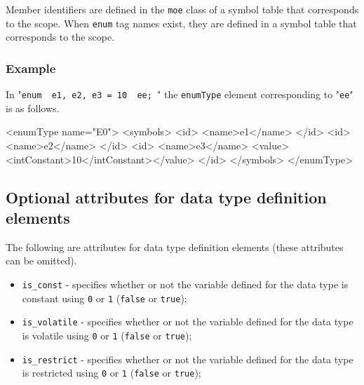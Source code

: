 Member identifiers are defined in the {\tt moe} class of a symbol table that corresponds to the scope.  When {\tt enum} tag names exist, they are defined in a symbol table that corresponds to the scope.

\subsubsection*{Example}

In "{\tt enum { e1, e2, e3 = 10 } ee; }" the {\tt enumType} element corresponding to "{\tt ee}" is as follows.
\vspace{2mm}

\begin{XcodeMLExample}
  <enumType name="E0">
    <symbols> 
      <id>
        <name>e1</name>
      </id>
      <id>
        <name>e2</name>
      </id>
      <id>
        <name>e3</name>
        <value><intConstant>10</intConstant></value>
      </id>
    </symbols>
  </enumType>
\end{XcodeMLExample}


\subsection{Optional attributes for data type definition elements}

The following are attributes for data type definition elements (these attributes can be omitted).

\begin{itemize}
\item {\tt is\_const} - specifies whether or not the variable defined for the data type is constant using {\tt 0} or {\tt 1} ({\tt false} or {\tt true});
\item {\tt is\_volatile} - specifies whether or not the variable defined for the data type is volatile using {\tt 0} or {\tt 1} ({\tt false} or {\tt true});
\item {\tt is\_restrict} - specifies whether or not the variable defined for the data type is restricted using {\tt 0} or {\tt 1} ({\tt false} or {\tt true});
\end{itemize}


